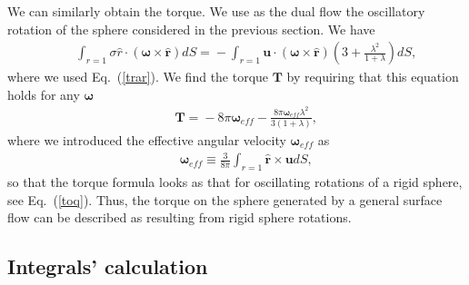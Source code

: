 \documentclass[aps,prx,twocolumn,amsmath,amssymb,amsfonts]{revtex4-2}
\begin{document}
{{\begin{appendices}
We can similarly obtain the torque. We use as the dual flow the oscillatory rotation of the sphere considered in the previous section. We have
\begin{eqnarray}&&\!\!\!\!\!\!
\int_{r=1}\!\sigma{\hat r}\!\cdot\!  \left(\bm \omega\!\times\! \bm {\hat r} \right) dS\!=\!-\int_{r=1} \!\bm u\!\cdot\!(\bm \omega\!\times\!\bm {\hat r}) \left(3\!+\!\frac{\lambda^2}{1\!+\!\lambda}\right)dS,\nonumber
\end{eqnarray}
where we used Eq.~(\ref{trar}). We find the torque $\bm T$ by requiring that this equation holds for any $\bm \omega$
\begin{eqnarray}&&\!\!\!\!\!\!
\bm T\!=\!-8\pi\bm \omega_{eff}-\frac{8\pi\bm \omega_{eff} \lambda^2}{3(1+\lambda)},  \label{trt}
\end{eqnarray}
where we introduced the effective angular velocity $\bm \omega_{eff}$ as
\begin{eqnarray}&&\!\!\!\!\!\!
\bm  \omega_{eff}\!\equiv \!\frac{3}{8\pi} \int_{r=1} \!\bm {\hat r} \!\times\! \bm u dS, \label{ome}
\end{eqnarray}
so that the torque formula looks as that for oscillating rotations of a rigid sphere, see Eq.~(\ref{toq}). Thus, the torque on the sphere generated by a general surface flow can be described as resulting from rigid sphere rotations.

\subsection{Integrals' calculation}


\end{appendices}}}
\end{document}
